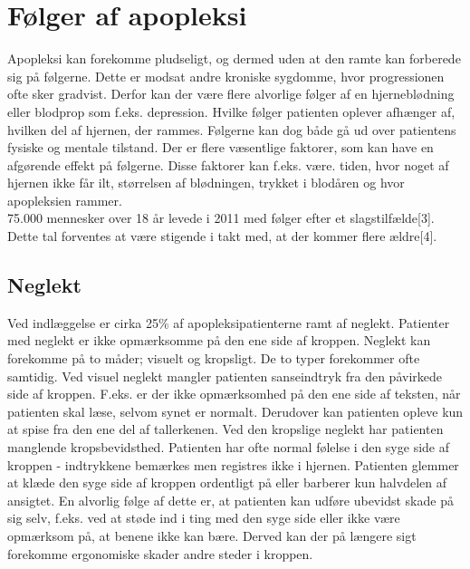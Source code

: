 \section{Følger af apopleksi }
Apopleksi kan forekomme pludseligt, og dermed uden at den ramte kan forberede sig på følgerne. Dette er modsat andre kroniske sygdomme, hvor progressionen ofte sker gradvist. Derfor kan der være flere alvorlige følger af en hjerneblødning eller blodprop som f.eks. depression. \cite{Muus2008} Hvilke følger patienten oplever afhænger af, hvilken del af hjernen, der rammes.\cite{Michael-Titus2010} Følgerne kan dog både gå ud over patientens fysiske og mentale tilstand. Der er flere væsentlige faktorer, som kan have en afgørende effekt på følgerne. Disse faktorer kan f.eks. være. tiden, hvor noget af hjernen ikke får ilt, størrelsen af blødningen, trykket i blodåren og hvor apopleksien rammer.\cite{Michael-Titus2010} \\
75.000 mennesker over 18 år levede i 2011 med følger efter et slagstilfælde[3]. Dette tal forventes at være stigende i takt med, at der kommer flere ældre[4]. %

\subsection{Neglekt}
Ved indlæggelse er cirka 25\% af apopleksipatienterne ramt af neglekt.
Patienter med neglekt er ikke opmærksomme på den ene side af kroppen. Neglekt kan forekomme på to måder; visuelt og kropsligt. De to typer forekommer ofte samtidig. Ved visuel neglekt mangler patienten sanseindtryk fra den påvirkede side af kroppen. F.eks. er der ikke opmærksomhed på den ene side af teksten, når patienten skal læse, selvom synet er normalt. Derudover kan patienten opleve kun at spise fra den ene del af tallerkenen. Ved den kropslige neglekt har patienten manglende kropsbevidsthed. Patienten har ofte normal følelse i den syge side af kroppen - indtrykkene bemærkes men registres ikke i hjernen. Patienten glemmer at klæde den syge side af kroppen ordentligt på eller barberer kun halvdelen af ansigtet. En alvorlig følge af dette er, at patienten kan udføre ubevidst skade på sig selv, f.eks. ved at støde ind i ting med den syge side eller ikke være opmærksom på, at benene ikke kan bære. Derved kan der på længere sigt forekomme ergonomiske skader andre steder i kroppen. \cite{Sundhed.dk}

